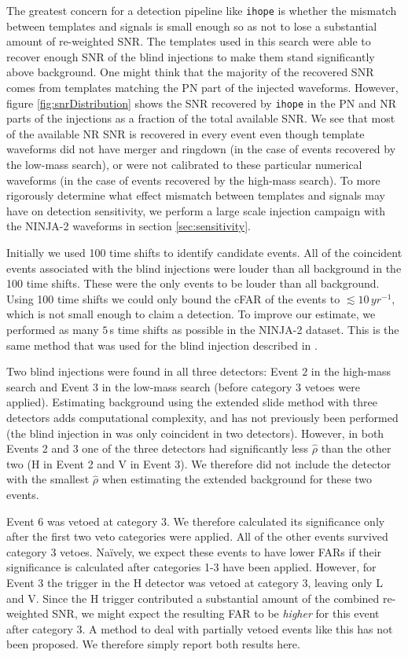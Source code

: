 \documentclass[12pt]{iopart}
\newcommand{\ihope}{\texttt{ihope}}
\begin{document}
The greatest concern for a detection pipeline like \ihope{} is whether 
the mismatch between templates and signals is small enough so as not to lose a 
substantial amount of re-weighted SNR. The templates used in this 
search were able to recover enough SNR of the blind injections to make them 
stand
significantly above background. One might think that the majority of the
recovered SNR comes from templates matching the PN part of the injected
waveforms.  However, figure \ref{fig:snrDistribution} shows the SNR recovered by
\ihope{} in the PN and NR parts of the injections as a fraction of the total
available SNR.  We see that most of the available NR SNR is recovered in every
event even though template waveforms did not have merger and ringdown (in the
case of events recovered by the low-mass search), or were not calibrated to
these particular numerical waveforms (in the case of events recovered by the
high-mass search). To more rigorously determine what effect mismatch between
templates and signals may have on detection sensitivity, we perform a large
scale injection campaign with the NINJA-2 waveforms in section 
\ref{sec:sensitivity}.

Initially we used 100 time shifts to identify candidate events. All of the
coincident events associated with the blind injections were louder than
all background in the 100 time shifts. These were the only events to be
louder than all background. Using 100 time shifts we could only bound the cFAR
of the events to $\lesssim 10\,yr^{-1}$, which is not small enough to claim a
detection. To improve our estimate, we performed as many $5\,$s time shifts as
possible in the NINJA-2 dataset. This is the same
method that was used for the blind injection described in
\cite{Colaboration:2011np}. 

Two blind injections were found in all three detectors: Event $2$ in the
high-mass search and Event $3$ in the low-mass search (before category 3 vetoes
were applied).  Estimating background using the extended slide method with
three detectors adds computational complexity, and has not previously been
performed (the blind injection in \cite{Colaboration:2011np} was only
coincident in two detectors). However, in both Events 2 and 3 one of the three
detectors had significantly less $\hat{\rho}$ than the other two (H in Event 2
and V in Event 3). We therefore did not include the detector with the smallest
$\hat{\rho}$ when estimating the extended background for these two events. 

Event 6 was vetoed at category 3. We therefore calculated its significance only
after the first two veto categories were applied. All of the other events
survived category 3 vetoes. Na\"{i}vely, we expect these events to have lower
FARs if their significance is calculated after categories 1-3 have been
applied. However, for Event 3 the trigger in the H detector was vetoed at
category 3, leaving only L and V. Since the H trigger contributed a substantial
amount of the combined re-weighted SNR, we might expect the resulting FAR to be 
\emph{higher} for this event after category 3. A method to deal 
with partially vetoed events like this has not been proposed. We therefore 
simply report both results here.
\end{document}
